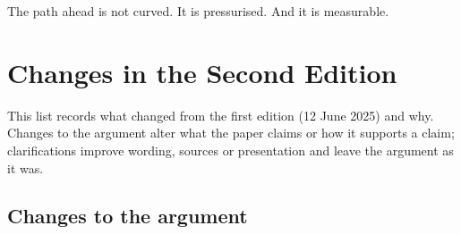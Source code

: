 \documentclass[11pt,a4paper]{article}
\begin{document}
The path ahead is not curved. It is pressurised. And it is measurable.

\clearpage
\section*{Changes in the Second Edition}

This list records what changed from the first edition (12 June 2025) and why. Changes to the argument alter what the paper claims or how it supports a claim; clarifications improve wording, sources or presentation and leave the argument as it was.

\subsection*{Changes to the argument}
\end{document}
